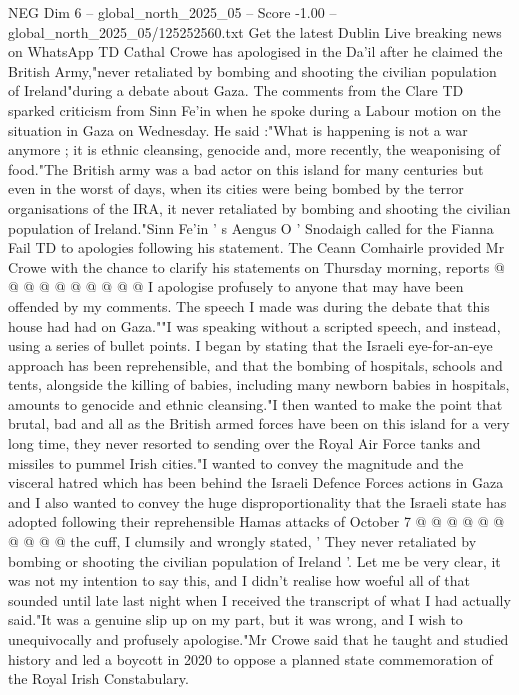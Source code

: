 \begin{textsample}{NEG Dim 6 – global\_north\_2025\_05 – Score -1.00 – global\_north\_2025\_05/125252560.txt}  \label{ex:f6_neg_376}
Get the latest Dublin Live breaking news on WhatsApp TD Cathal Crowe has apologised in the Da'il after he claimed the British Army,"never retaliated by bombing and shooting the civilian population of Ireland"during a debate about Gaza.
The comments from the Clare TD sparked criticism from Sinn Fe'in when he spoke during a Labour motion on the situation in Gaza on Wednesday.
He said :"What is happening is not a war anymore ; it is ethnic cleansing, genocide and, more recently, the weaponising of food."The British army was a bad actor on this island for many centuries but even in the worst of days, when its cities were being bombed by the terror organisations of the IRA, it never retaliated by bombing and shooting the civilian population of Ireland."Sinn Fe'in ' s Aengus O ' Snodaigh called for the Fianna Fail TD to apologies following his statement.
The Ceann Comhairle provided Mr Crowe with the chance to clarify his statements on Thursday morning, reports @ @ @ @ @ @ @ @ @ @ I apologise profusely to anyone that may have been offended by my comments.
The speech I made was during the debate that this house had had on Gaza.""I was speaking without a scripted speech, and instead, using a series of bullet points.
I began by stating that the Israeli eye-for-an-eye approach has been reprehensible, and that the bombing of hospitals, schools and tents, alongside the killing of babies, including many newborn babies in hospitals, amounts to genocide and ethnic cleansing."I then wanted to make the point that brutal, bad and all as the British armed forces have been on this island for a very long time, they never resorted to sending over the Royal Air Force tanks and missiles to pummel Irish cities."I wanted to convey the magnitude and the visceral hatred which has been behind the Israeli Defence Forces actions in Gaza and I also wanted to convey the huge disproportionality that the Israeli state has adopted following their reprehensible Hamas attacks of October 7 @ @ @ @ @ @ @ @ @ @ the cuff, I clumsily and wrongly stated, ' They never retaliated by bombing or shooting the civilian population of Ireland '.
Let me be very clear, it was not my intention to say this, and I didn't realise how woeful all of that sounded until late last night when I received the transcript of what I had actually said."It was a genuine slip up on my part, but it was wrong, and I wish to unequivocally and profusely apologise."Mr Crowe said that he taught and studied history and led a boycott in 2020 to oppose a planned state commemoration of the Royal Irish Constabulary.

\end{textsample}
